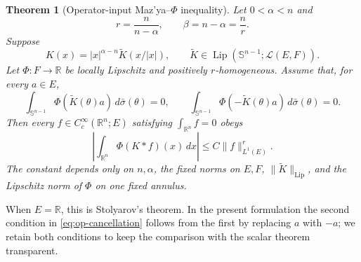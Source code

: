 \documentclass[10pt,a4paper]{amsart}
\numberwithin{equation}{section}
\newtheorem{theorem}{Theorem}[section]
\newcommand{\R}{\mathbb R}
\newcommand{\Sph}{\mathbb S}
\newcommand{\cL}{\mathcal L}
\newcommand{\norm}[1]{\lVert #1\rVert}
\begin{document}
\begin{theorem}[Operator-input Maz'ya--$\Phi$ inequality]\label{thm:operator-phi}
Let $0<\alpha<n$ and
\[
 r=\frac{n}{n-\alpha},\qquad \beta=n-\alpha=\frac nr.
\]
Suppose
\begin{equation}\label{eq:op-kernel}
 K(x)=|x|^{\alpha-n}\widetilde K(x/|x|),
 \qquad
 \widetilde K\in \operatorname{Lip}(\Sph^{n-1};\cL(E,F)).
\end{equation}
Let $\Phi:F\to\R$ be locally Lipschitz and positively $r$-homogeneous.  Assume
that, for every $a\in E$,
\begin{equation}\label{eq:op-cancellation}
 \int_{\Sph^{n-1}}\Phi(\widetilde K(\theta)a)\,d\bar\sigma(\theta)=0,
 \qquad
 \int_{\Sph^{n-1}}\Phi(-\widetilde K(\theta)a)\,d\bar\sigma(\theta)=0.
\end{equation}
Then every $f\in C_c^\infty(\R^n;E)$ satisfying $\int_{\R^n}f=0$ obeys
\begin{equation}\label{eq:op-phi-estimate}
 \left|\int_{\R^n}\Phi(K*f)(x)\,dx\right|
 \le C\norm{f}_{L^1(E)}^r.
\end{equation}
The constant depends only on $n,\alpha$, the fixed norms on $E,F$,
$\norm{\widetilde K}_{\operatorname{Lip}}$, and the Lipschitz norm of $\Phi$
on one fixed annulus.
\end{theorem}


When $E=\R$, this is Stolyarov's theorem.  In the present formulation the
second condition in \eqref{eq:op-cancellation} follows from the first by
replacing $a$ with $-a$; we retain both conditions to keep the comparison with
the scalar theorem transparent.
\end{document}
